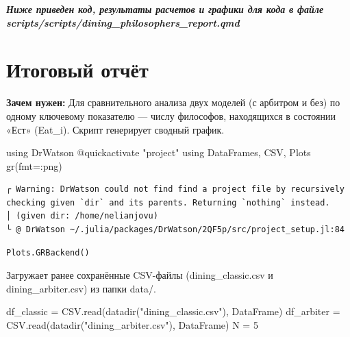 \documentclass[
  12pt,
  a4paper,
  DIV=11,
  numbers=noendperiod]{scrreprt}
\newenvironment{Shaded}{\begin{snugshade}}{\end{snugshade}}
\newcommand{\BuiltInTok}[1]{\textcolor[rgb]{0.00,0.23,0.31}{#1}}
\newcommand{\FloatTok}[1]{\textcolor[rgb]{0.68,0.00,0.00}{#1}}
\newcommand{\FunctionTok}[1]{\textcolor[rgb]{0.28,0.35,0.67}{#1}}
\newcommand{\ImportTok}[1]{\textcolor[rgb]{0.00,0.46,0.62}{#1}}
\newcommand{\NormalTok}[1]{\textcolor[rgb]{0.00,0.23,0.31}{#1}}
\newcommand{\OperatorTok}[1]{\textcolor[rgb]{0.37,0.37,0.37}{#1}}
\newcommand{\PreprocessorTok}[1]{\textcolor[rgb]{0.68,0.00,0.00}{#1}}
\newcommand{\StringTok}[1]{\textcolor[rgb]{0.13,0.47,0.30}{#1}}
\begin{document}
\textbf{\emph{Ниже приведен код, результаты расчетов и графики для кода
в файле scripts/scripts/dining\_philosophers\_report.qmd}}

\section{Итоговый
отчёт}\label{ux438ux442ux43eux433ux43eux432ux44bux439-ux43eux442ux447ux451ux442-1}

\textbf{Зачем нужен:} Для сравнительного анализа двух моделей (с
арбитром и без) по одному ключевому показателю --- числу философов,
находящихся в состоянии «Ест» (Eat\_i). Скрипт генерирует сводный
график.

\begin{Shaded}
\begin{Highlighting}[]
\ImportTok{using} \BuiltInTok{DrWatson}
\PreprocessorTok{@quickactivate} \StringTok{"project"}
\ImportTok{using} \BuiltInTok{DataFrames}\NormalTok{, }\BuiltInTok{CSV}\NormalTok{, }\BuiltInTok{Plots}
\FunctionTok{gr}\NormalTok{(fmt}\OperatorTok{=:}\NormalTok{png)}
\end{Highlighting}
\end{Shaded}

\begin{verbatim}
┌ Warning: DrWatson could not find find a project file by recursively checking given `dir` and its parents. Returning `nothing` instead.
│ (given dir: /home/nelianjovu)
└ @ DrWatson ~/.julia/packages/DrWatson/2QF5p/src/project_setup.jl:84
\end{verbatim}

\begin{verbatim}
Plots.GRBackend()
\end{verbatim}

Загружает ранее сохранённые CSV-файлы (dining\_classic.csv и
dining\_arbiter.csv) из папки data/.

\begin{Shaded}
\begin{Highlighting}[]
\NormalTok{df\_classic }\OperatorTok{=}\NormalTok{ CSV.}\FunctionTok{read}\NormalTok{(}\FunctionTok{datadir}\NormalTok{(}\StringTok{"dining\_classic.csv"}\NormalTok{), DataFrame)}
\NormalTok{df\_arbiter }\OperatorTok{=}\NormalTok{ CSV.}\FunctionTok{read}\NormalTok{(}\FunctionTok{datadir}\NormalTok{(}\StringTok{"dining\_arbiter.csv"}\NormalTok{), DataFrame)}
\NormalTok{N }\OperatorTok{=} \FloatTok{5}
\end{Highlighting}
\end{Shaded}
\end{document}
